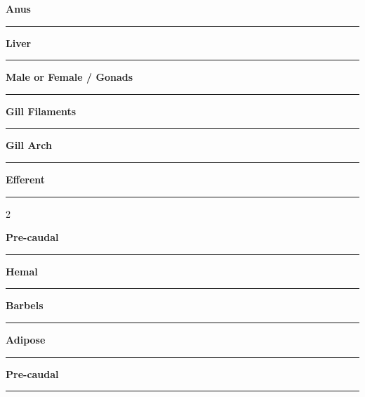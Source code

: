 \documentclass[11pt]{exam}
\newcommand*\Matching[1]{
\ifprintanswers
	\textbf{#1}
\else
	\rule{2.1in}{0.4pt}
\fi
}
\newlength\matchlena
\newlength\matchlenb
\newcommand\MatchQuestion[2]{%
	\setlength\matchlenb{\linewidth}
	\addtolength\matchlenb{-\matchlena}
	\parbox[t]{\matchlena}{\Matching{#1}}\enspace\parbox[t]{\matchlenb}{#2}}
\begin{document}
\begin{questions}
\begin{multicols}{2}

\question\MatchQuestion{Anus}{}
\vspace{2\baselineskip}

\question\MatchQuestion{Liver}{}
\vspace{2\baselineskip}


\question\MatchQuestion{Male or Female / Gonads}{}
\vspace{2\baselineskip}

\columnbreak



\question\MatchQuestion{Gill Filaments}{}
\vspace{2\baselineskip}

\question\MatchQuestion{Gill Arch}{}
\vspace{2\baselineskip}

\question[\textsc{ec}]\MatchQuestion{Efferent} 

\vspace{2\baselineskip}



\question\MatchQuestion{Pre-caudal}{}
\vspace{2\baselineskip}


\question\MatchQuestion{Hemal}{}
\vspace{2\baselineskip}



\question\MatchQuestion{Barbels}{}
\vspace{2\baselineskip}
%

\question\MatchQuestion{Adipose}{}

\vspace{2\baselineskip}

\question[\textsc{ec}]\MatchQuestion{Pre-caudal}{}

\end{multicols}

\end{questions}
\end{document}
